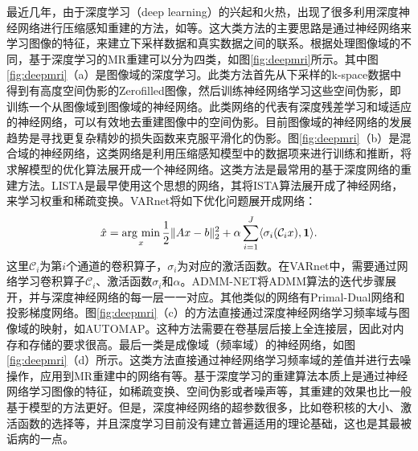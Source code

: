 最近几年，由于深度学习\cite{lecun2015deep,schmidhuber2015deep}（deep learning）的兴起和火热，出现了很多利用深度神经网络进行压缩感知重建的方法，如\cite{jin2017deep,admmnet,wang2016accelerating,lee2018deep,han2018deep,zhu2018image,unetcs,varnet,gannet}等。这大类方法的主要思路是通过神经网络来学习图像的特征，来建立下采样数据和真实数据之间的联系。根据处理图像域的不同，基于深度学习的MR重建可以分为四类，如图\ref{fig:deepmri}所示。其中图\ref{fig:deepmri}（a）是图像域的深度学习。此类方法首先从下采样的k-space数据中得到有高度空间伪影的Zerofilled图像，然后训练神经网络学习这些空间伪影，即训练一个从图像域到图像域的神经网络。此类网络的代表有深度残差学习\cite{lee2018deep}和域适应的神经网络\cite{han2018deep}，可以有效地去重建图像中的空间伪影。目前图像域的神经网络的发展趋势是寻找更复杂精妙的损失函数来克服平滑化的伪影。图\ref{fig:deepmri}（b）是混合域的神经网络，这类网络是利用压缩感知模型中的数据项来进行训练和推断，将求解模型的优化算法展开成一个神经网络。这类方法是最常用的基于深度网络的重建方法。LISTA\cite{gregor2010learning}是最早使用这个思想的网络，其将ISTA算法\cite{beck2009fast}展开成了神经网络，来学习权重和稀疏变换。VARnet\cite{varnet}将如下优化问题展开成网络：
\begin{equation}
	\hat{x}=\argmin_x\frac{1}{2}\|Ax-b\|_2^2+\alpha\sum_{i=1}^J\langle \sigma_i(\mathcal{C}_ix),\textbf{1}\rangle.
\end{equation}
这里$\mathcal{C}_i$为第$i$个通道的卷积算子，$\sigma_i$为对应的激活函数。在VARnet中，需要通过网络学习卷积算子$\mathcal{C}_i$、激活函数$\sigma_i$和$\alpha$。ADMM-NET\cite{admmnet}将ADMM算法的迭代步骤展开，并与深度神经网络的每一层一一对应。其他类似的网络有Primal-Dual\cite{adler2018learned}网络和投影梯度\cite{gupta2018cnn}网络。图\ref{fig:deepmri}（c）的方法直接通过深度神经网络学习频率域与图像域的映射，如AUTOMAP\cite{zhu2018image}。这种方法需要在卷基层后接上全连接层，因此对内存和存储的要求很高。最后一类是成像域（频率域）的神经网络，如图\ref{fig:deepmri}（d）所示。这类方法直接通过神经网络学习频率域的差值并进行去噪操作，应用到MR重建中的网络有\cite{han2019k,lee2019k}等。基于深度学习的重建算法本质上是通过神经网络学习图像的特征，如稀疏变换、空间伪影或者噪声等，其重建的效果也比一般基于模型的方法更好。但是，深度神经网络的超参数很多，比如卷积核的大小、激活函数的选择等，并且深度学习目前没有建立普遍适用的理论基础，这也是其最被诟病的一点。
